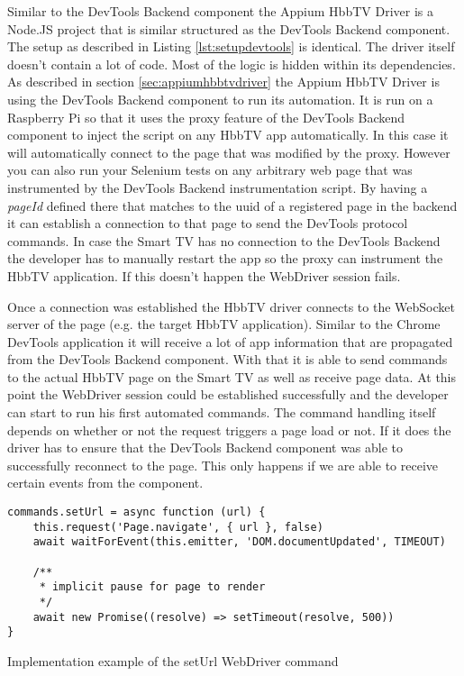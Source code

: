 Similar to the DevTools Backend component the Appium HbbTV Driver is a Node.JS project that is similar
structured as the DevTools Backend component. The setup as described in Listing \ref{lst:setupdevtools}
is identical. The driver itself doesn't contain a lot of code. Most of the logic is hidden within its
dependencies. As described in section \ref{sec:appiumhbbtvdriver} the Appium HbbTV Driver is using the
DevTools Backend component to run its automation. It is run on a Raspberry Pi so that it uses the proxy
feature of the DevTools Backend component to inject the script on any HbbTV app automatically. In this
case it will automatically connect to the page that was modified by the proxy. However you can also run
your Selenium tests on any arbitrary web page that was instrumented by the DevTools Backend instrumentation
script. By having a \textit{pageId} defined there that matches to the uuid of a registered page in the
backend it can establish a connection to that page to send the DevTools protocol commands. In case the
Smart TV has no connection to the DevTools Backend the developer has to manually restart the app so the
proxy can instrument the HbbTV application. If this doesn't happen the WebDriver session fails.

Once a connection was established the HbbTV driver connects to the WebSocket server of the page (e.g.
the target HbbTV application). Similar to the Chrome DevTools application it will receive a lot of
app information that are propagated from the DevTools Backend component. With that it is able to send
commands to the actual HbbTV page on the Smart TV as well as receive page data. At this point the
WebDriver session could be established successfully and the developer can start to run his first automated
commands. The command handling itself depends on whether or not the request triggers a page load or not.
If it does the driver has to ensure that the DevTools Backend component was able to successfully reconnect
to the page. This only happens if we are able to receive certain events from the component.

\begin{listing}[H]
\begin{verbatim}
commands.setUrl = async function (url) {
    this.request('Page.navigate', { url }, false)
    await waitForEvent(this.emitter, 'DOM.documentUpdated', TIMEOUT)

    /**
     * implicit pause for page to render
     */
    await new Promise((resolve) => setTimeout(resolve, 500))
}
\end{verbatim}
\caption{Implementation example of the setUrl WebDriver command}
\label{lst:setUrl}
\end{listing}

